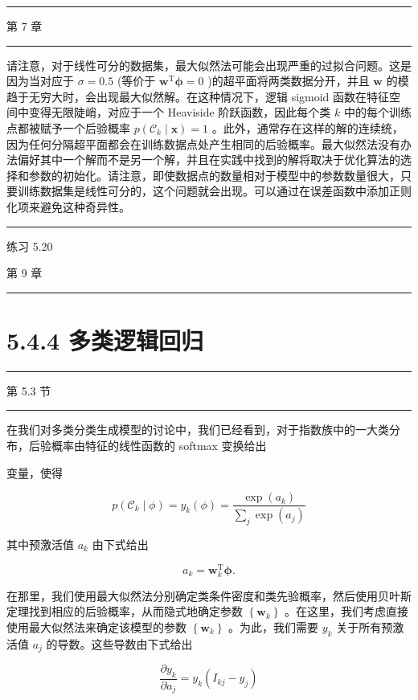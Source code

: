 \documentclass[10pt]{report}
\newcommand{\HRule}{\begin{center}\rule{0.9\linewidth}{0.2mm}\end{center}}
\begin{document}
\HRule

第 7 章

\HRule

请注意，对于线性可分的数据集，最大似然法可能会出现严重的过拟合问题。这是因为当对应于 \(\sigma  = {0.5}\) (等价于 \({\mathbf{w}}^{\mathrm{T}}\mathbf{\phi } = 0\) )的超平面将两类数据分开，并且 \(\mathbf{w}\) 的模趋于无穷大时，会出现最大似然解。在这种情况下，逻辑 sigmoid 函数在特征空间中变得无限陡峭，对应于一个 Heaviside 阶跃函数，因此每个类 \(k\) 中的每个训练点都被赋予一个后验概率 \(p\left( {{\mathcal{C}}_{k} \mid  \mathbf{x}}\right)  = 1\) 。此外，通常存在这样的解的连续统，因为任何分隔超平面都会在训练数据点处产生相同的后验概率。最大似然法没有办法偏好其中一个解而不是另一个解，并且在实践中找到的解将取决于优化算法的选择和参数的初始化。请注意，即使数据点的数量相对于模型中的参数数量很大，只要训练数据集是线性可分的，这个问题就会出现。可以通过在误差函数中添加正则化项来避免这种奇异性。

\HRule

练习 5.20

第 9 章

\HRule

\section*{5.4.4 多类逻辑回归}

\HRule

第 5.3 节

\HRule

在我们对多类分类生成模型的讨论中，我们已经看到，对于指数族中的一大类分布，后验概率由特征的线性函数的 softmax 变换给出

变量，使得

\[
p\left( {{\mathcal{C}}_{k} \mid  \phi }\right)  = {y}_{k}\left( \phi \right)  = \frac{\exp \left( {a}_{k}\right) }{\mathop{\sum }\limits_{j}\exp \left( {a}_{j}\right) } \tag{5.76}
\]

其中预激活值 \({a}_{k}\) 由下式给出

\[
{a}_{k} = {\mathbf{w}}_{k}^{\mathrm{T}}\mathbf{\phi }. \tag{5.77}
\]

在那里，我们使用最大似然法分别确定类条件密度和类先验概率，然后使用贝叶斯定理找到相应的后验概率，从而隐式地确定参数 \(\left\{  {\mathbf{w}}_{k}\right\}\) 。在这里，我们考虑直接使用最大似然法来确定该模型的参数 \(\left\{  {\mathbf{w}}_{k}\right\}\) 。为此，我们需要 \({y}_{k}\) 关于所有预激活值 \({a}_{j}\) 的导数。这些导数由下式给出

\[
\frac{\partial {y}_{k}}{\partial {a}_{j}} = {y}_{k}\left( {{I}_{kj} - {y}_{j}}\right)  \tag{5.78}
\]
\end{document}

